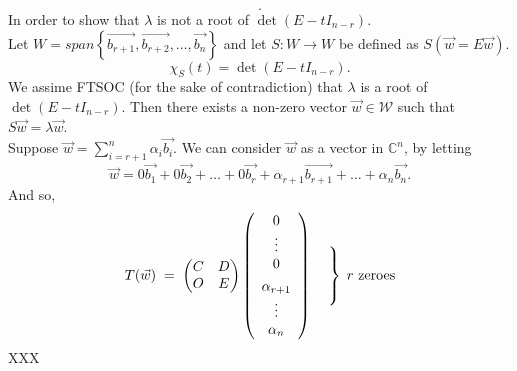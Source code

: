 \documentclass{report}
\begin{document}
{\begin{enumerate}[label=(\arabic*).]
\[     .\] 
     In order to show that $ \lambda$ is not a root of $ \det \left( E - t I_{n-r} \right)$.\\
     Let $ W = span \left\{ \vec{ b_{r+1}}, \vec{ b_{r+2}}, \ldots , \vec{ b_n}    \right\} $ and let $ S: W \to W $ be defined as $ S \left( \vec{ w} = E \vec{ w}  \right) $.\\
     \[
     \chi _{S} \left( t \right) = \det \left( E - t I_{n-r} \right)
     .\]  
     We assime FTSOC (for the sake of contradiction) that $ \lambda$ is a root of $ \det \left( E - t I_{n-r} \right)$. Then there exists a non-zero vector $ \vec{ w} \in \mathcal{W}$ such that $ S \vec{ w} = \lambda \vec{ w}$.\\
     Suppose $ \vec{ w} = \sum\limits_{i=r+1}^{n} \alpha _i \vec{ b_i}$. We can consider $ \vec{ w} $ as a vector in $ \mathbb{C} ^{n}$, by letting 
     \[
     \vec{ w} = 0 \vec{ b_1} + 0 \vec{ b_2} + \ldots + 0 \vec{ b_r} + \alpha _{r+1} \vec{ b_{r+1}} + \ldots + \alpha _n \vec{ b_n}
     .\] 
     And so,
      \[
T(\vec{w})
\;=\;
\begin{pmatrix}
C & D\\
O & E
\end{pmatrix}
\left(
\begin{array}{c}
0\\
\vdots\\
0\\[4pt]        %
\alpha_{r+1}\\
\vdots\\
\alpha_{n}
\end{array}
\right)
\quad
\left.\vphantom{\begin{array}{c}0\\\vdots\\0\end{array}}\right\}
\; r\ \text{zeroes}
\]
 XXX
     

\end{enumerate}}
\end{document}
